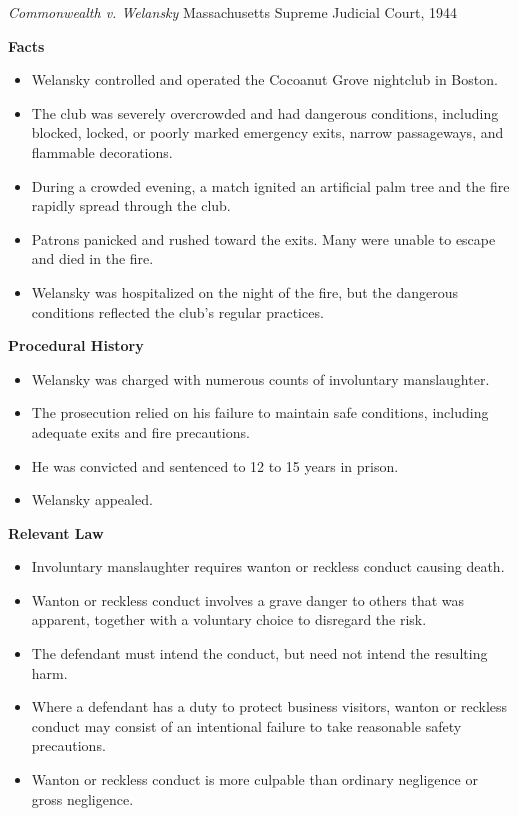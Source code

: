 \documentclass[11pt]{tex/lawoutline}
\begin{document}
\casebox
    {\textit{Commonwealth v. Welansky}}
    {Massachusetts Supreme Judicial Court, 1944}
    {
        \textbf{Facts}
        \begin{itemize}
            \item Welansky controlled and operated the Cocoanut Grove nightclub in Boston.
            \item The club was severely overcrowded and had dangerous conditions, including blocked, locked, or poorly marked emergency exits, narrow passageways, and flammable decorations.
            \item During a crowded evening, a match ignited an artificial palm tree and the fire rapidly spread through the club.
            \item Patrons panicked and rushed toward the exits. Many were unable to escape and died in the fire.
            \item Welansky was hospitalized on the night of the fire, but the dangerous conditions reflected the club's regular practices.
        \end{itemize}

        \textbf{Procedural History}
        \begin{itemize}
            \item Welansky was charged with numerous counts of involuntary manslaughter.
            \item The prosecution relied on his failure to maintain safe conditions, including adequate exits and fire precautions.
            \item He was convicted and sentenced to 12 to 15 years in prison.
            \item Welansky appealed.
        \end{itemize}

        \textbf{Relevant Law}
        \begin{itemize}
            \item Involuntary manslaughter requires wanton or reckless conduct causing death.
            \item Wanton or reckless conduct involves a grave danger to others that was apparent, together with a voluntary choice to disregard the risk.
            \item The defendant must intend the conduct, but need not intend the resulting harm.
            \item Where a defendant has a duty to protect business visitors, wanton or reckless conduct may consist of an intentional failure to take reasonable safety precautions.
            \item Wanton or reckless conduct is more culpable than ordinary negligence or gross negligence.
        \end{itemize}

}
\end{document}
